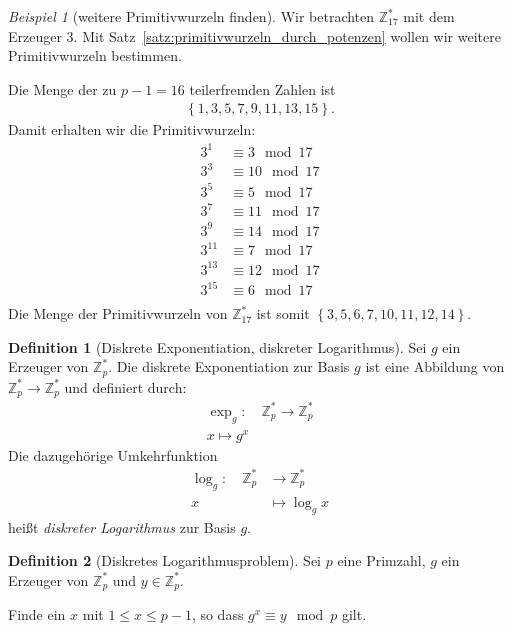 \documentclass[
  a4paper,
  11pt,
]{scrartcl}
\theoremstyle{plain}
\theoremstyle{definition}
\newtheorem{definition}{Definition}
\theoremstyle{remark}
\newtheorem{beispiel}{Beispiel}
\newcommand{\Z}{\mathbb{Z}}
\begin{document}
\begin{beispiel}[weitere Primitivwurzeln finden]
  Wir betrachten $\Z_{17}^*$ mit dem Erzeuger $3$. Mit
  Satz~\ref{satz:primitivwurzeln_durch_potenzen} wollen wir weitere
  Primitivwurzeln bestimmen.

  Die Menge der zu $p-1 = 16$ teilerfremden Zahlen ist
  \begin{align*}
    \left\{1, 3, 5, 7, 9, 11, 13, 15 \right\}.
  \end{align*}
  Damit erhalten wir die Primitivwurzeln:
  \begin{align*}
    3^1 & \equiv 3 \mod 17\\
    3^3 & \equiv 10 \mod 17\\
    3^5 & \equiv 5 \mod 17\\
    3^7 & \equiv 11 \mod 17\\
    3^9 & \equiv 14 \mod 17\\
    3^{11} & \equiv 7 \mod 17\\
    3^{13} & \equiv 12 \mod 17\\
    3^{15} & \equiv 6 \mod 17\\
  \end{align*}
  Die Menge der Primitivwurzeln von $\Z_{17}^*$ ist somit
  $\left\{ 3, 5, 6, 7, 10, 11, 12, 14 \right\}$.
\end{beispiel}

\begin{definition}[Diskrete Exponentiation, diskreter Logarithmus]
  Sei $g$ ein Erzeuger von $\Z_p^*$. Die diskrete Exponentiation zur Basis $g$
  ist eine Abbildung von $\Z_p^* \to \Z_p^*$ und definiert durch:
  \begin{align*}
    \exp_g: \quad \Z_p^* \to \Z_p^*\\
    x \mapsto g^x
  \end{align*}
  Die dazugehörige Umkehrfunktion
  \begin{align*}
    \log_g: \quad \Z_p^* & \to \Z_p^*\\
    x & \mapsto \log_g x
  \end{align*}
  heißt \emph{diskreter Logarithmus} zur Basis $g$.
\end{definition}

\begin{definition}[Diskretes Logarithmusproblem]\label{def:diskretes_logarithmusproblem}
  Sei $p$ eine Primzahl, $g$ ein Erzeuger von $\Z_p^*$ und $y \in \Z_p^*$.

  Finde ein $x$ mit $1 \leq x \leq p-1$, so dass $g^x \equiv y \mod p$ gilt.
\end{definition}
\end{document}
